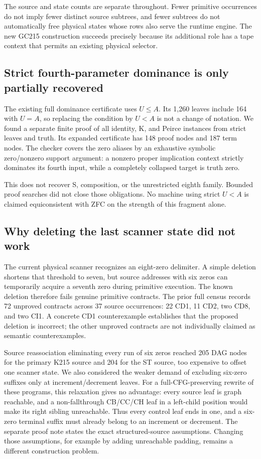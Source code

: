 \documentclass[10pt,a4paper]{article}
\begin{document}
The source and state counts are separate throughout.  Fewer primitive
occurrences do not imply fewer distinct source subtrees, and fewer subtrees
do not automatically free physical states whose rows also serve the runtime
engine.  The new GC215 construction succeeds precisely because its additional
role has a tape context that permits an existing physical selector.

\subsection{Strict fourth-parameter dominance is only partially recovered}

The existing full dominance certificate uses $U\le A$.  Its 1,260 leaves
include 164 with $U=A$, so replacing the condition by $U<A$ is not a change
of notation.  We found a separate finite proof of all identity, K, and
Peirce instances from strict leaves and truth.  Its expanded certificate has
148 proof nodes and 187 term nodes.  The checker covers the zero aliases by
an exhaustive symbolic zero/nonzero support argument: a nonzero proper
implication context strictly dominates its fourth input, while a completely
collapsed target is truth zero.

This does not recover S, composition, or the unrestricted eighth family.
Bounded proof searches did not close those obligations.  No machine using
strict $U<A$ is claimed equiconsistent with ZFC on the strength of this
fragment alone.

\subsection{Why deleting the last scanner state did not work}

The current physical scanner recognizes an eight-zero delimiter.  A simple
deletion shortens that threshold to seven, but source addresses with six
zeros can temporarily acquire a seventh zero during primitive execution.
The known deletion therefore fails genuine primitive contracts.  The prior
full census records 72 unproved contracts across 37 source occurrences:
22 CD1, 11 CD2, two CD8, and two CI1. A concrete CD1 counterexample
establishes that the proposed deletion is incorrect; the other unproved
contracts are not individually claimed as semantic counterexamples.

Source reassociation eliminating every run of six zeros reached 205 DAG
nodes for the primary K215 source and 204 for the ST source, too expensive
to offset one scanner state.  We also considered the weaker demand of
excluding six-zero suffixes only at increment/decrement leaves.  For a
full-CFG-preserving rewrite of these programs, this relaxation gives no
advantage: every source leaf is graph reachable, and a non-fallthrough
CB/CC/CH leaf in a left-child position would make its right sibling
unreachable.  Thus every control leaf ends in one, and a six-zero terminal
suffix must already belong to an increment or decrement.  The separate
proof note states the exact structured-source assumptions.  Changing those
assumptions, for example by adding unreachable padding, remains a different
construction problem.
\end{document}
